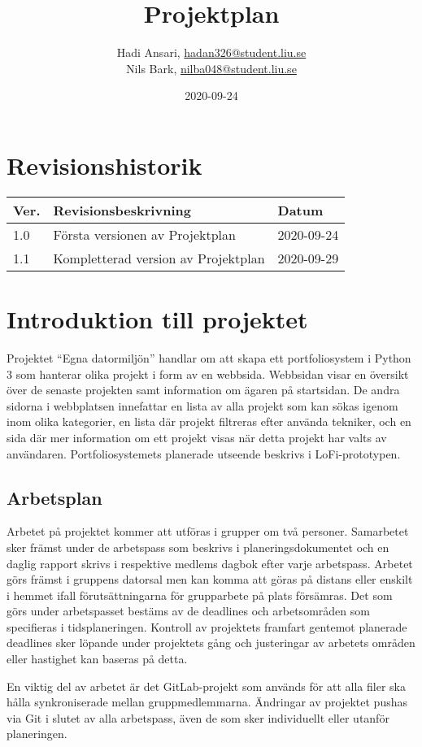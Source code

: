 \documentclass{TDP003mall}
\author{Hadi Ansari, \url{hadan326@student.liu.se}\\
  Nils Bark, \url{nilba048@student.liu.se}}
\title{Projektplan}
\date{2020-09-24}
\begin{document}
\projectpage
\section{Revisionshistorik}
\begin{table}[!h]
\begin{tabularx}{\linewidth}{|l|X|l|}
\hline
Ver. & Revisionsbeskrivning & Datum \\\hline
1.0 & Första versionen av Projektplan & 2020-09-24 \\\hline
1.1 & Kompletterad version av Projektplan & 2020-09-29\\\hline
\end{tabularx}
\end{table}

\section{Introduktion till projektet}
Projektet ``Egna datormiljön'' handlar om att skapa ett portfoliosystem i Python 3 som hanterar olika projekt i form av en webbsida. Webbsidan visar en översikt över de senaste projekten samt information om ägaren på startsidan. De andra sidorna i webbplatsen innefattar en lista av alla projekt som kan sökas igenom inom olika kategorier, en lista där projekt filtreras efter använda tekniker, och en sida där mer information om ett projekt visas när detta projekt har valts av användaren. Portfoliosystemets planerade utseende beskrivs i LoFi-prototypen.

\subsection{Arbetsplan}
Arbetet på projektet kommer att utföras i grupper om två personer. Samarbetet sker främst under de arbetspass som beskrivs i planeringsdokumentet och en daglig rapport skrivs i respektive medlems dagbok efter varje arbetspass. Arbetet görs främst i gruppens datorsal men kan komma att göras på distans eller enskilt i hemmet ifall förutsättningarna för grupparbete på plats försämras. Det som görs under arbetspasset bestäms av de deadlines och arbetsområden som specifieras i tidsplaneringen. Kontroll av projektets framfart gentemot planerade deadlines sker löpande under projektets gång och justeringar av arbetets områden eller hastighet kan baseras på detta.

En viktig del av arbetet är det GitLab-projekt som används för att alla filer ska hålla synkroniserade mellan gruppmedlemmarna. Ändringar av projektet pushas via Git i slutet av alla arbetspass, även de som sker individuellt eller utanför planeringen. 
\end{document}
